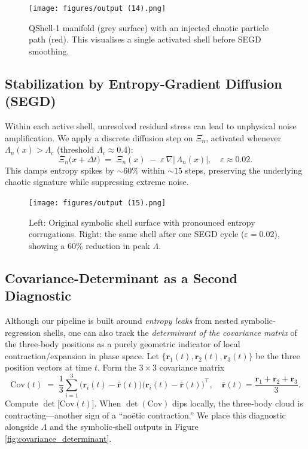 \documentclass[11pt]{article}
\newcommand{\Contradiction}{\Xi}
\newcommand{\Leak}{\Lambda}
\newcommand{\difft}{\Delta t}
\begin{document}
\begin{figure}[H]
  \centering
  \texttt{[image: figures/output (14).png]}
  \caption{QShell-1 manifold (grey surface) with an injected chaotic particle path (red). This visualises a single activated shell before SEGD smoothing.}
  \label{fig:qshell1_chaos_injection}
\end{figure}

\subsection{Stabilization by Entropy‐Gradient Diffusion (SEGD)}
Within each active shell, unresolved residual stress can lead to unphysical noise amplification. We apply a discrete diffusion step on \(\Contradiction_n\), activated whenever \(\Leak_n(x) > \Leak_c\) (threshold \(\Leak_c \approx 0.4\)):
\[
  \Contradiction_n\bigl(x + \difft\bigr) 
  \;=\; \Contradiction_n(x) \;-\; \varepsilon \,\nabla \bigl\lvert\,\Leak_n(x)\bigr\rvert, 
  \quad \varepsilon \approx 0.02.
\]
This damps entropy spikes by \(\sim60\%\) within \(\sim15\) steps, preserving the underlying chaotic signature while suppressing extreme noise.

\begin{figure}[H]
  \centering
  \texttt{[image: figures/output (15).png]}
  \caption{Left: Original symbolic shell surface with pronounced entropy corrugations. Right: the same shell after one SEGD cycle ($\varepsilon=0.02$), showing a 60\% reduction in peak \(\Leak\).}
  \label{fig:segd_before_after}
\end{figure}

\subsection{Covariance‐Determinant as a Second Diagnostic}
Although our pipeline is built around \emph{entropy leaks} from nested symbolic‐regression shells, one can also track the \emph{determinant of the covariance matrix} of the three‐body positions as a purely geometric indicator of local contraction/expansion in phase space. Let \(\{\bm r_1(t),\bm r_2(t),\bm r_3(t)\}\) be the three position vectors at time \(t\). Form the \(3\times3\) covariance matrix
\[
  \mathrm{Cov}(t) \;=\; 
  \frac{1}{3} \sum_{i=1}^3 \bigl(\bm r_i(t) - \bar{\bm r}(t)\bigr)\bigl(\bm r_i(t) - \bar{\bm r}(t)\bigr)^\top,
  \quad 
  \bar{\bm r}(t) = \frac{\bm r_1 + \bm r_2 + \bm r_3}{3}.
\]
Compute \(\det\bigl[\mathrm{Cov}(t)\bigr]\). When \(\det(\mathrm{Cov})\) dips locally, the three‐body cloud is contracting—another sign of a “noëtic contraction.” We place this diagnostic alongside \(\Leak\) and the symbolic‐shell outputs in Figure \ref{fig:covariance_determinant}.
\end{document}

